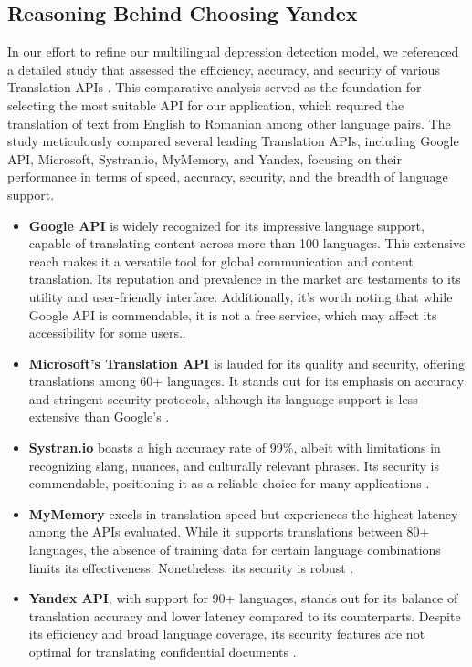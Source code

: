 \subsection{Reasoning Behind Choosing Yandex}

\quad In our effort to refine our multilingual depression detection model, we referenced a detailed study that assessed the efficiency, accuracy, and security of various Translation APIs \cite{rashmi2020comparison}. This comparative analysis served as the foundation for selecting the most suitable API for our application, which required the translation of text from English to Romanian among other language pairs. The study meticulously compared several leading Translation APIs, including Google API, Microsoft, Systran.io, MyMemory, and Yandex, focusing on their performance in terms of speed, accuracy, security, and the breadth of language support.
\begin{itemize}
\item \textbf{Google API} is widely recognized for its impressive language support, capable of translating content across more than 100 languages. This extensive reach makes it a versatile tool for global communication and content translation. Its reputation and prevalence in the market are testaments to its utility and user-friendly interface. Additionally, it's worth noting that while Google API is commendable, it is not a free service, which may affect its accessibility for some users.\cite{rashmi2020comparison}.

\item \textbf{Microsoft's Translation API} is lauded for its quality and security, offering translations among 60+ languages. It stands out for its emphasis on accuracy and stringent security protocols, although its language support is less extensive than Google's \cite{rashmi2020comparison}.

\item \textbf{Systran.io} boasts a high accuracy rate of 99\%, albeit with limitations in recognizing slang, nuances, and culturally relevant phrases. Its security is commendable, positioning it as a reliable choice for many applications \cite{rashmi2020comparison}.

\item \textbf{MyMemory} excels in translation speed but experiences the highest latency among the APIs evaluated. While it supports translations between 80+ languages, the absence of training data for certain language combinations limits its effectiveness. Nonetheless, its security is robust \cite{rashmi2020comparison}.

\item \textbf{Yandex API}, with support for 90+ languages, stands out for its balance of translation accuracy and lower latency compared to its counterparts. Despite its efficiency and broad language coverage, its security features are not optimal for translating confidential documents \cite{rashmi2020comparison}.
\end{itemize}

